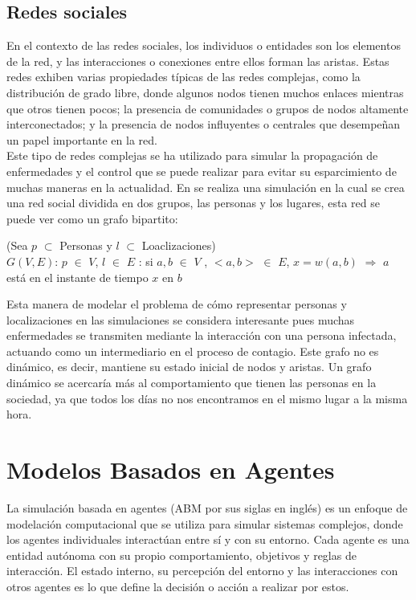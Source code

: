 \subsection{Redes sociales}
En el contexto de las redes sociales, los individuos o entidades son los elementos de la red, 
y las interacciones o conexiones entre ellos forman las aristas. Estas redes exhiben varias propiedades 
típicas de las redes complejas, como la distribución de grado libre, donde algunos nodos tienen 
muchos enlaces mientras que otros tienen pocos; la presencia de comunidades o grupos de nodos altamente 
interconectados; y la presencia de nodos influyentes o centrales que desempeñan un papel importante en la 
red.\autocite{Newman2003}\\

Este tipo de redes complejas se ha utilizado para simular la propagación de enfermedades y el control que se puede
realizar para evitar su esparcimiento de muchas maneras en la actualidad. En \autocite{Eubank2004} 
se realiza una simulación en la cual se crea una red social dividida en dos grupos, las personas y los lugares, esta red 
se puede ver como un grafo bipartito:
\begin{center}
    (Sea $p$ $\subset$ Personas y $l$ $\subset$ Loaclizaciones)\\
    $G(V,E)$: $p$ $\in$ $V$, 
$l$ $\in$ $E$ : si $a,b$ $\in$ $V$ , $<a,b>$ $\in$ $E$, $x = w(a,b)$  $\Rightarrow$ $a$ está en el instante de tiempo $x$ en $b$
\end{center} 
Esta manera de modelar el problema de cómo representar personas y localizaciones en las simulaciones se considera 
interesante pues muchas enfermedades se transmiten mediante la interacción con una persona infectada, actuando como un 
intermediario en el proceso de contagio. Este grafo no es dinámico, es decir, mantiene su estado inicial de nodos y aristas.
Un grafo dinámico se acercaría más al comportamiento que tienen las personas en la sociedad, ya que todos los días no nos encontramos
en el mismo lugar a la misma hora.



\section{Modelos Basados en Agentes}
La simulación basada en agentes (ABM por sus siglas en inglés) es un enfoque de modelación computacional que se utiliza para 
simular sistemas complejos, donde los agentes individuales interactúan entre sí y con su entorno. Cada agente es una entidad 
autónoma con su propio comportamiento, objetivos y reglas de interacción. El estado interno,
su percepción del entorno y las interacciones con otros agentes es lo que define la decisión o acción a realizar por
estos. \autocite{Macal2010} \\ 

